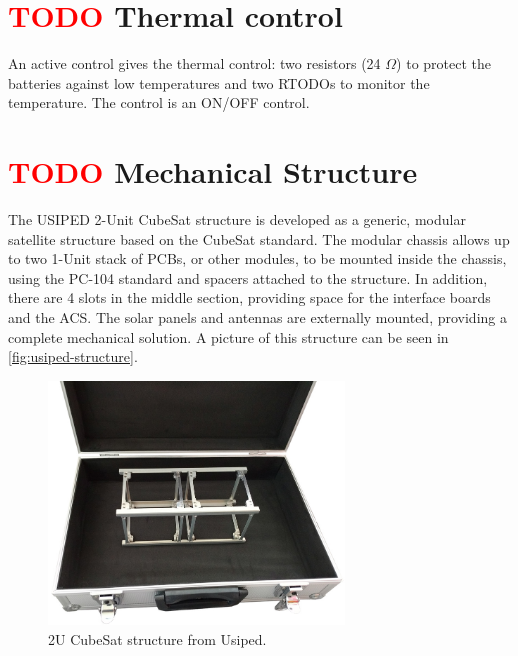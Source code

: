 \section{ \textcolor{red}{TODO} Thermal control}

An active control gives the thermal control: two resistors (24 $\Omega$) to protect the batteries against low temperatures and two RTODOs to monitor the temperature. The control is an ON/OFF control.



\section{ \textcolor{red}{TODO} Mechanical Structure}

The USIPED 2-Unit CubeSat structure is developed as a generic, modular satellite structure based on the CubeSat standard. The modular chassis allows up to two 1-Unit stack of PCBs, or other modules, to be mounted inside the chassis, using the PC-104 standard and spacers attached to the structure. In addition, there are 4 slots in the middle section, providing space for the interface boards and the ACS. The solar panels and antennas are externally mounted, providing a complete mechanical solution. A picture of this structure can be seen in \autoref{fig:usiped-structure}.

\begin{figure}[!ht]
    \begin{center}
        \includegraphics[width=0.7\textwidth]{figures/subsystems/usiped-2u-structure.jpg}
        \caption{2U CubeSat structure from Usiped.}
        \label{fig:usiped-structure}
    \end{center}
\end{figure}


